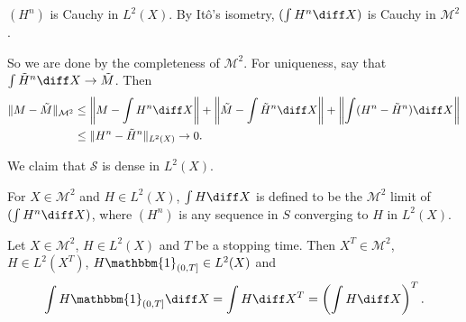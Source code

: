 \documentclass[12pt]{article}
\begin{document}
\begin{proofbox}
	$(H^{n})$ is Cauchy in $L^2(X)$. By It\^o's isometry, $(\int H^n \diff X)$ is Cauchy in $\mathcal{M}^2$.

	So we are done by the completeness of $\mathcal{M}^2$. For uniqueness, say that $\int \tilde H^n \diff X \to \tilde M$. Then
	\begin{align*}
		\|M - \tilde M\|_{\mathcal{M}^2} &\leq \biggl\|M - \int H^{n} \diff X\biggr\| + \biggl\|\tilde M - \int \tilde H^{n} \diff X\biggr\| + \biggl\| \int (H^{n} - \tilde H^{n}) \diff X\biggr\| \\
						 &\leq \|H^{n} - \tilde H^{n}\|_{L^2(X)} \to 0.
	\end{align*}
\end{proofbox}

We claim that $\mathcal{S}$ is dense in $L^2(X)$.

\begin{definition}
	For $X \in \mathcal{M}^2$ and $H \in L^2(X)$, $\int H \diff X$ is defined to be the $\mathcal{M}^2$ limit of $(\int H^{n} \diff X)$, where $(H^{n})$ is any sequence in $S$ converging to $H$ in $L^2(X)$.
\end{definition}

\begin{theorem}
	Let $X \in \mathcal{M}^2$, $H \in L^2(X)$ and $T$ be a stopping time. Then $X^T \in \mathcal{M}^2$, $H \in L^2(X^{T})$, $H \mathbbm{1}_{(0, T]} \in L^2(X)$ and
	\[
		\int H \mathbbm{1}_{(0, T]} \diff X = \int H \diff X^{T} = \left( \int H \diff X \right)^{T}.
	\]
\end{theorem}
\end{document}

